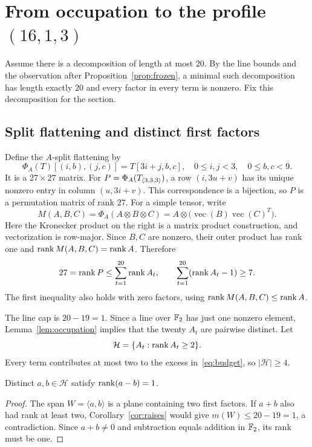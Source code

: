 \section{From occupation to the profile \texorpdfstring{$(16,1,3)$}{(16,1,3)}}\label{sec:geometry}

Assume there is a decomposition of length at most $20$. By the line
bounds and the observation after Proposition~\ref{prop:frozen}, a
minimal such decomposition has length exactly $20$ and every factor
in every term is nonzero. Fix this decomposition for the section.

\subsection{Split flattening and distinct first factors}
Define the $A$-split flattening by
\[
 \Phi_A(T)[(i,b),(j,c)]=T[3i+j,b,c],
 \quad 0\leq i,j<3,\quad 0\leq b,c<9.
\]
It is a $27\times27$ matrix. For $P=\Phi_A(T_{\langle3,3,3\rangle})$, a row
$(i,3u+v)$ has its unique nonzero entry in column $(u,3i+v)$.
This correspondence is a bijection, so $P$ is a permutation matrix
of rank $27$. For a simple tensor, write
\begin{equation}\label{eq:M}
 M(A,B,C)=\Phi_A(A\otimes B\otimes C)
          =A\otimes\bigl(\operatorname{vec}(B)
                           \operatorname{vec}(C)^T\bigr).
\end{equation}
Here the Kronecker product on the right is a matrix product construction,
and vectorization is row-major. Since $B,C$ are nonzero, their outer
product has rank one and $\operatorname{rank} M(A,B,C)=\operatorname{rank} A$. Therefore
\begin{equation}\label{eq:budget}
 27=\operatorname{rank} P\leq\sum_{t=1}^{20}\operatorname{rank} A_t,
 \qquad \sum_{t=1}^{20}(\operatorname{rank} A_t-1)\geq7.
\end{equation}
The first inequality also holds with zero factors, using
$\operatorname{rank} M(A,B,C)\leq\operatorname{rank} A$.

The line cap is $20-19=1$. Since a line over $\mathbb F_2$ has just one
nonzero element, Lemma~\ref{lem:occupation} implies that the twenty
$A_t$ are pairwise distinct. Let
\[
 \mathcal H=\{A_t:\operatorname{rank} A_t\geq2\}.
\]
Every term contributes at most two to the excess in~\eqref{eq:budget},
so $|\mathcal H|\geq4$.

\begin{lemma}\label{lem:pair}
Distinct $a,b\in\mathcal H$ satisfy $\operatorname{rank}(a-b)=1$.
\end{lemma}
\begin{proof}
The span $W=\langle a,b\rangle$ is a plane containing two first
factors. If $a+b$ also had rank at least two,
Corollary~\ref{cor:raises} would give $m(W)\leq20-19=1$, a
contradiction. Since $a+b\ne0$ and subtraction equals addition in
$\mathbb F_2$, its rank must be one.
\end{proof}

